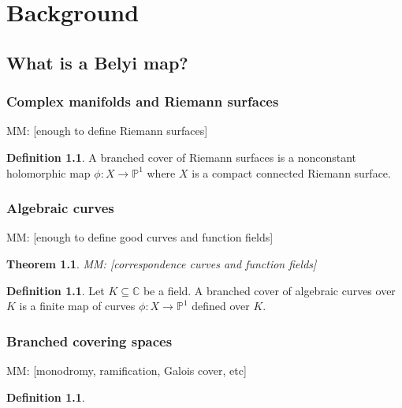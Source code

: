 \documentclass{dcthesis}
\newcommand{\PP}{\mathbb P}
\newcommand{\CC}{\mathbb C}
\newcommand{\defi}[1]{\textsf{#1}}
\newcommand{\mm}[1]{{\color{blue} \sf MM: [#1]}}
\newtheorem{theorem}[prop]{Theorem}
\theoremstyle{definition}
\newtheorem{definition}[prop]{Definition}
\theoremstyle{remark}
\numberwithin{equation}{section}
\numberwithin{figure}{section}
\begin{document}
\chapter{Background}{\label{chapter:background}
  \section{What is a Belyi map?}{\label{sec:belyimaps}
    \subsection{Complex manifolds and Riemann surfaces}{\label{subsec:complexmans}
      \mm{enough to define Riemann surfaces}
      \begin{definition}
        A \defi{branched cover of Riemann surfaces} is a nonconstant holomorphic map
        $\phi\colon X\to\PP^1$ where $X$ is a compact connected Riemann surface.
      \end{definition}
    }
    \subsection{Algebraic curves}{\label{subsec:algebraiccurves}
      \mm{enough to define good curves and function fields}
      \begin{theorem}\label{thm:curvesandfunctionfields}
        \mm{correspondence curves and function fields}
      \end{theorem}
      \begin{definition}
        Let $K\subseteq\CC$ be a field.
        A \defi{branched cover of algebraic curves over $K$}
        is a finite map of curves
        $\phi\colon X\to\PP^1$ defined over $K$.
      \end{definition}
    }
    \subsection{Branched covering spaces}{\label{subsec:branchedcovers}
      \mm{monodromy, ramification, Galois cover, etc}
      \begin{definition}\label{def:galoiscover}
      \end{definition}
    }
}}
\end{document}
